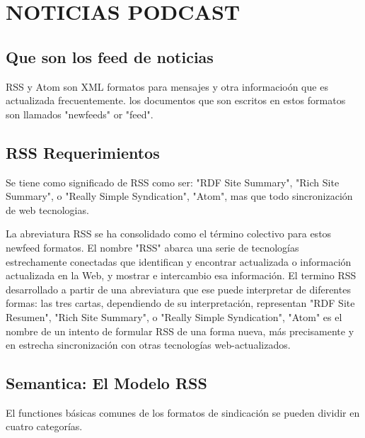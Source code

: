 \chapter{NOTICIAS PODCAST}

\section{Que son los feed de noticias}

RSS y Atom son XML formatos para mensajes y otra informacio\'{o}n que es actualizada frecuentemente.
los documentos que son escritos en estos formatos son llamados "newfeeds" or "feed".\cite{einstein}



\section{RSS Requerimientos}

Se tiene como significado de RSS como ser: "RDF Site Summary", "Rich Site Summary", o "Really Simple Syndication",
"Atom", mas que todo sincronizaci\'{o}n de web tecnologias.\cite{dirac}

\scriptsize

\begin{flushleft}

La abreviatura RSS se ha consolidado como el t\'{e}rmino colectivo para estos newfeed formatos. El nombre "RSS"
abarca una serie de tecnolog\'{i}as estrechamente conectadas que identifican y encontrar actualizada o informaci\'{o}n
actualizada en la Web, y mostrar e intercambio esa informaci\'{o}n. El termino RSS desarrollado a partir de una abreviatura que ese puede interpretar de diferentes formas: las tres cartas, dependiendo de su interpretaci\'{o}n,
representan "RDF Site Resumen", "Rich Site Summary", o "Really Simple Syndication", "Atom" es el nombre de un intento
de formular RSS de una forma nueva, m\'{a}s precisamente y en estrecha sincronizaci\'{o}n con otras tecnolog\'{i}as web-actualizados.

\end{flushleft}

\normalsize

\section{Semantica: El Modelo RSS}

El functiones b\'{a}sicas comunes de los formatos de sindicaci\'{o}n se pueden dividir en cuatro categor\'{i}as.

